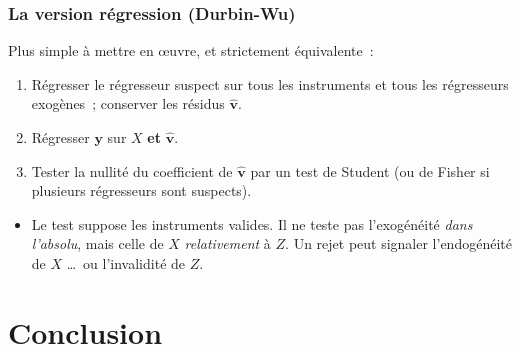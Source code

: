 \documentclass[10pt]{beamer}
\begin{document}
\begin{frame}
  \frametitle{La version régression (Durbin-Wu)}

  Plus simple à mettre en \oe uvre, et strictement équivalente~:

  \begin{enumerate}

  \item Régresser le régresseur suspect sur tous les instruments et tous les
    régresseurs exogènes~; conserver les résidus $\hat{\mathbf v}$.\newline

  \item Régresser $\mathbf y$ sur $X$ \textbf{et} $\hat{\mathbf v}$.\newline

  \item Tester la nullité du coefficient de $\hat{\mathbf v}$ par un test de
    Student (ou de Fisher si plusieurs régresseurs sont suspects).

  \end{enumerate}

  \medskip


  \medskip

  \begin{itemize}
  \item[\dbend] Le test suppose les instruments valides. Il ne teste pas
    l'exogénéité \emph{dans l'absolu}, mais celle de $X$ \emph{relativement}
    à $Z$. Un rejet peut signaler l'endogénéité de $X$ \dots\ ou l'invalidité
    de $Z$.
  \end{itemize}

\end{frame}


\section{Conclusion}
\end{document}
